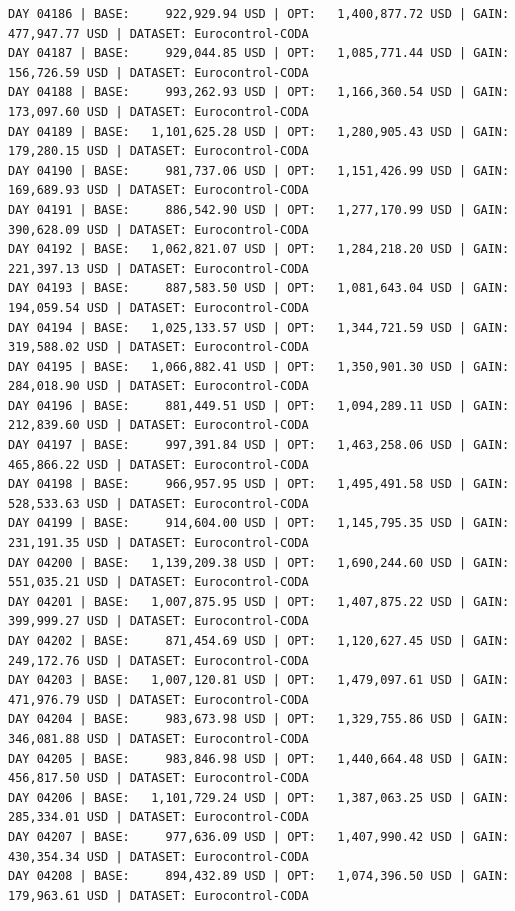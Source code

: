 \documentclass[11pt,a4paper]{article}
\begin{document}
\begin{verbatim}
DAY 04186 | BASE:     922,929.94 USD | OPT:   1,400,877.72 USD | GAIN: 477,947.77 USD | DATASET: Eurocontrol-CODA
DAY 04187 | BASE:     929,044.85 USD | OPT:   1,085,771.44 USD | GAIN: 156,726.59 USD | DATASET: Eurocontrol-CODA
DAY 04188 | BASE:     993,262.93 USD | OPT:   1,166,360.54 USD | GAIN: 173,097.60 USD | DATASET: Eurocontrol-CODA
DAY 04189 | BASE:   1,101,625.28 USD | OPT:   1,280,905.43 USD | GAIN: 179,280.15 USD | DATASET: Eurocontrol-CODA
DAY 04190 | BASE:     981,737.06 USD | OPT:   1,151,426.99 USD | GAIN: 169,689.93 USD | DATASET: Eurocontrol-CODA
DAY 04191 | BASE:     886,542.90 USD | OPT:   1,277,170.99 USD | GAIN: 390,628.09 USD | DATASET: Eurocontrol-CODA
DAY 04192 | BASE:   1,062,821.07 USD | OPT:   1,284,218.20 USD | GAIN: 221,397.13 USD | DATASET: Eurocontrol-CODA
DAY 04193 | BASE:     887,583.50 USD | OPT:   1,081,643.04 USD | GAIN: 194,059.54 USD | DATASET: Eurocontrol-CODA
DAY 04194 | BASE:   1,025,133.57 USD | OPT:   1,344,721.59 USD | GAIN: 319,588.02 USD | DATASET: Eurocontrol-CODA
DAY 04195 | BASE:   1,066,882.41 USD | OPT:   1,350,901.30 USD | GAIN: 284,018.90 USD | DATASET: Eurocontrol-CODA
DAY 04196 | BASE:     881,449.51 USD | OPT:   1,094,289.11 USD | GAIN: 212,839.60 USD | DATASET: Eurocontrol-CODA
DAY 04197 | BASE:     997,391.84 USD | OPT:   1,463,258.06 USD | GAIN: 465,866.22 USD | DATASET: Eurocontrol-CODA
DAY 04198 | BASE:     966,957.95 USD | OPT:   1,495,491.58 USD | GAIN: 528,533.63 USD | DATASET: Eurocontrol-CODA
DAY 04199 | BASE:     914,604.00 USD | OPT:   1,145,795.35 USD | GAIN: 231,191.35 USD | DATASET: Eurocontrol-CODA
DAY 04200 | BASE:   1,139,209.38 USD | OPT:   1,690,244.60 USD | GAIN: 551,035.21 USD | DATASET: Eurocontrol-CODA
DAY 04201 | BASE:   1,007,875.95 USD | OPT:   1,407,875.22 USD | GAIN: 399,999.27 USD | DATASET: Eurocontrol-CODA
DAY 04202 | BASE:     871,454.69 USD | OPT:   1,120,627.45 USD | GAIN: 249,172.76 USD | DATASET: Eurocontrol-CODA
DAY 04203 | BASE:   1,007,120.81 USD | OPT:   1,479,097.61 USD | GAIN: 471,976.79 USD | DATASET: Eurocontrol-CODA
DAY 04204 | BASE:     983,673.98 USD | OPT:   1,329,755.86 USD | GAIN: 346,081.88 USD | DATASET: Eurocontrol-CODA
DAY 04205 | BASE:     983,846.98 USD | OPT:   1,440,664.48 USD | GAIN: 456,817.50 USD | DATASET: Eurocontrol-CODA
DAY 04206 | BASE:   1,101,729.24 USD | OPT:   1,387,063.25 USD | GAIN: 285,334.01 USD | DATASET: Eurocontrol-CODA
DAY 04207 | BASE:     977,636.09 USD | OPT:   1,407,990.42 USD | GAIN: 430,354.34 USD | DATASET: Eurocontrol-CODA
DAY 04208 | BASE:     894,432.89 USD | OPT:   1,074,396.50 USD | GAIN: 179,963.61 USD | DATASET: Eurocontrol-CODA

\end{verbatim}
\end{document}
